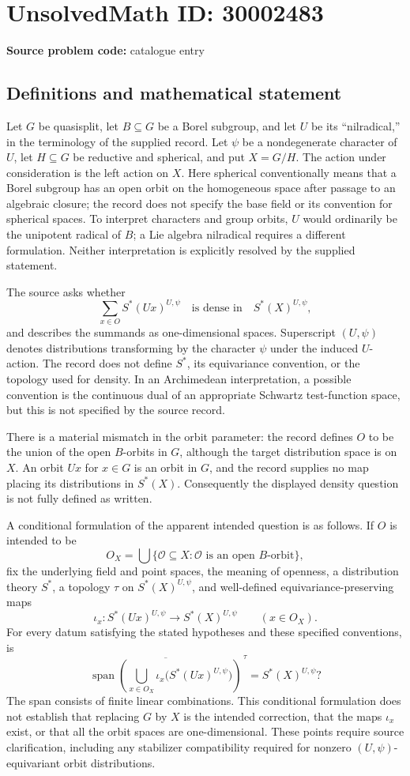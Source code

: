 \documentclass[11pt]{article}
\begin{document}
\section*{UnsolvedMath ID: 30002483}
\textbf{Source problem code:} catalogue entry
\subsection{Definitions and mathematical statement}
Let \(G\) be quasisplit, let \(B\subseteq G\) be a Borel subgroup, and let \(U\) be its ``nilradical,'' in the terminology of the supplied record. Let \(\psi\) be a nondegenerate character of \(U\), let \(H\subseteq G\) be reductive and spherical, and put \(X=G/H\). The action under consideration is the left action on \(X\). Here spherical conventionally means that a Borel subgroup has an open orbit on the homogeneous space after passage to an algebraic closure; the record does not specify the base field or its convention for spherical spaces. To interpret characters and group orbits, \(U\) would ordinarily be the unipotent radical of \(B\); a Lie algebra nilradical requires a different formulation. Neither interpretation is explicitly resolved by the supplied statement.

The source asks whether
\[
\sum_{x\in O} S^*(Ux)^{U,\psi}
\quad\text{is dense in}\quad
S^*(X)^{U,\psi},
\]
and describes the summands as one-dimensional spaces. Superscript \((U,\psi)\) denotes distributions transforming by the character \(\psi\) under the induced \(U\)-action. The record does not define \(S^*\), its equivariance convention, or the topology used for density. In an Archimedean interpretation, a possible convention is the continuous dual of an appropriate Schwartz test-function space, but this is not specified by the source record.

There is a material mismatch in the orbit parameter: the record defines \(O\) to be the union of the open \(B\)-orbits in \(G\), although the target distribution space is on \(X\). An orbit \(Ux\) for \(x\in G\) is an orbit in \(G\), and the record supplies no map placing its distributions in \(S^*(X)\). Consequently the displayed density question is not fully defined as written.

A conditional formulation of the apparent intended question is as follows. If \(O\) is intended to be
\[
O_X=\bigcup\{\mathcal O\subseteq X:\mathcal O\text{ is an open }B\text{-orbit}\},
\]
fix the underlying field and point spaces, the meaning of openness, a distribution theory \(S^*\), a topology \(\tau\) on \(S^*(X)^{U,\psi}\), and well-defined equivariance-preserving maps
\[
\iota_x:S^*(Ux)^{U,\psi}\longrightarrow S^*(X)^{U,\psi}
\qquad(x\in O_X).
\]
For every datum satisfying the stated hypotheses and these specified conventions, is
\[
\overline{\operatorname{span}\!\left(
\bigcup_{x\in O_X}\iota_x\bigl(S^*(Ux)^{U,\psi}\bigr)
\right)}^{\,\tau}
=S^*(X)^{U,\psi}?
\]
The span consists of finite linear combinations. This conditional formulation does not establish that replacing \(G\) by \(X\) is the intended correction, that the maps \(\iota_x\) exist, or that all the orbit spaces are one-dimensional. These points require source clarification, including any stabilizer compatibility required for nonzero \((U,\psi)\)-equivariant orbit distributions.
\end{document}
